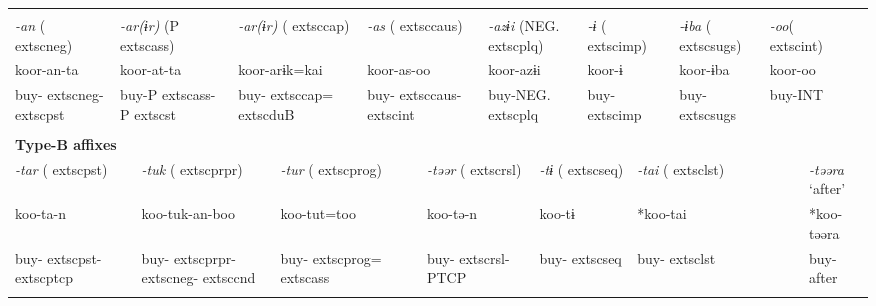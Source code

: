 \tabletail{}
\tablelasttail{}
\begin{tabularx}{\textwidth}{XXXXXXXXXXXXXXXXXXXXXXX}
\lsptoprule
\multicolumn{23}{X}{{\bfseries Type-A affixes}}\\
{ \textit{{}-an} (	extsc{neg})} & \multicolumn{5}{X}{{ \textit{{}-ar(ɨr)} (P	extsc{ass})}} & \multicolumn{3}{X}{{ \textit{{}-ar(ɨr)} (	extsc{cap})}} & \multicolumn{4}{X}{{ \textit{{}-as} (	extsc{caus})}} & \multicolumn{4}{X}{{ \textit{{}-azɨi} (NEG.	extsc{plq})}} & \multicolumn{2}{X}{{ \textit{{}-ɨ} (	extsc{imp})}} & { \textit{{}-ɨba} (	extsc{sugs})} & \multicolumn{2}{X}{{ \textit{{}-oo}(	extsc{int})}} & \\
{ koor-an-ta} & \multicolumn{5}{X}{{ koor-at-ta}} & \multicolumn{3}{X}{{ koor-arɨk=kai}} & \multicolumn{4}{X}{{ koor-as-oo}} & \multicolumn{4}{X}{{ koor-azɨi}} & \multicolumn{2}{X}{{ koor-ɨ}} & { koor-ɨba} & \multicolumn{2}{X}{{ koor-oo}} & \\
buy-	extsc{neg}-	extsc{pst} & \multicolumn{5}{X}{buy-P	extsc{ass}-P	extsc{st}} & \multicolumn{3}{X}{buy-	extsc{cap}=	extsc{du}B} & \multicolumn{4}{X}{buy-	extsc{caus}-	extsc{int}} & \multicolumn{4}{X}{buy-NEG.	extsc{plq}} & \multicolumn{2}{X}{buy-	extsc{imp}} & buy-	extsc{sugs} & \multicolumn{2}{X}{buy-INT} & \\
\multicolumn{23}{X}{}\\
\multicolumn{23}{X}{{\bfseries Type-B affixes}}\\
\multicolumn{2}{X}{{ \textit{{}-tar} (	extsc{pst})}} & \multicolumn{5}{X}{{ \textit{{}-tuk} (	extsc{prpr})}} & \multicolumn{4}{X}{{ \textit{{}-tur} (	extsc{prog})}} & \multicolumn{4}{X}{{ \textit{{}-təər} (	extsc{rsl})}} & \multicolumn{3}{X}{{ \textit{{}-tɨ} (	extsc{seq})}} & \multicolumn{3}{X}{{ \textit{{}-tai} (	extsc{lst})}} & \multicolumn{2}{X}{{ \textit{{}-təəra} ‘after’}}\\
\multicolumn{2}{X}{{ koo-ta-n}} & \multicolumn{5}{X}{{ koo-tuk-an-boo}} & \multicolumn{4}{X}{{ koo-tut=too}} & \multicolumn{4}{X}{{ koo-tə-n}} & \multicolumn{3}{X}{{ koo-tɨ}} & \multicolumn{3}{X}{{ *koo-tai}} & \multicolumn{2}{X}{{ *koo-təəra}}\\
\multicolumn{2}{X}{buy-	extsc{pst}-	extsc{ptcp}} & \multicolumn{5}{X}{buy-	extsc{prpr}-	extsc{neg}-	extsc{cnd}} & \multicolumn{4}{X}{buy-	extsc{prog}=	extsc{ass}} & \multicolumn{4}{X}{buy-	extsc{rsl}-PTCP} & \multicolumn{3}{X}{buy-	extsc{seq}} & \multicolumn{3}{X}{buy-	extsc{lst}} & \multicolumn{2}{X}{{ buy-after}}\\
\multicolumn{2}{X}{} & \multicolumn{5}{X}{} & \multicolumn{4}{X}{} & \multicolumn{4}{X}{} & \multicolumn{3}{X}{} & \multicolumn{3}{X}{} & \multicolumn{2}{X}{}\\

\end{tabularx}
